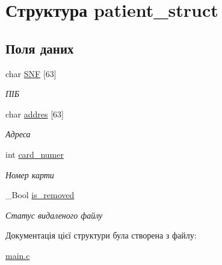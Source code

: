 \hypertarget{structpatient__struct}{}\section{Структура patient\+\_\+struct}
\label{structpatient__struct}
\subsection*{Поля даних}
\begin{DoxyCompactItemize}
\item 
\mbox{\label{structpatient__struct_a1748953b20361f0e24b467da0ef4a41c}} 
char \hyperlink{structpatient__struct_a1748953b20361f0e24b467da0ef4a41c}{S\+NF} \mbox{[}63\mbox{]}
\begin{DoxyCompactList}\small\item\em ПІБ \end{DoxyCompactList}\item 
\mbox{\label{structpatient__struct_a74e029a3ea6a1d9896abb9477f53dcf8}} 
char \hyperlink{structpatient__struct_a74e029a3ea6a1d9896abb9477f53dcf8}{addres} \mbox{[}63\mbox{]}
\begin{DoxyCompactList}\small\item\em Адреса \end{DoxyCompactList}\item 
\mbox{\label{structpatient__struct_a06e0e04046e9434904f4e53bb8583332}} 
int \hyperlink{structpatient__struct_a06e0e04046e9434904f4e53bb8583332}{card\+\_\+numer}
\begin{DoxyCompactList}\small\item\em Номер карти \end{DoxyCompactList}\item 
\mbox{\label{structpatient__struct_ad2475b69abfa9243c2700d63b63aa79b}} 
\+\_\+\+Bool \hyperlink{structpatient__struct_ad2475b69abfa9243c2700d63b63aa79b}{is\+\_\+removed}
\begin{DoxyCompactList}\small\item\em Статус видаленого файлу \end{DoxyCompactList}\end{DoxyCompactItemize}


Документація цієї структури була створена з файлу\+:\begin{DoxyCompactItemize}
\item 
\hyperlink{main_8c}{main.\+c}\end{DoxyCompactItemize}
